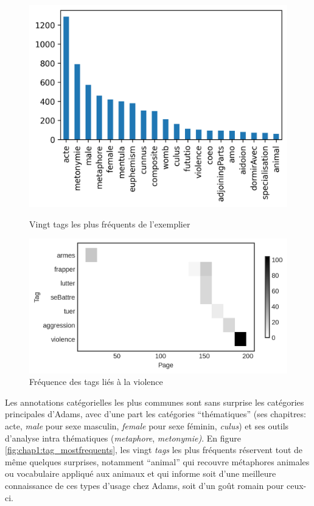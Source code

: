 \begin{figure}
    \centering
    \begin{minipage}[b]{.48\linewidth}%
        \includegraphics[width=\linewidth]{figures/chap1/part3/exemplier/tags.png}
        \caption{Vingt tags les plus fréquents de l'exemplier}
        \label{fig:chap1:tag_mostfrequents}
    \end{minipage}
    \hfill
    \begin{minipage}[b]{.48\linewidth}%
        \includegraphics[width=\linewidth]{figures/chap1/part3/exemplier/violence.png}
        \caption{Fréquence des tags liés à la violence}
        \label{fig:chap1:tags_violence}
    \end{minipage}
\end{figure}

Les annotations catégorielles les plus communes sont sans surprise les catégories principales d'Adams, avec d'une part les catégories \enquote{thématiques} (ses chapitres: acte, \textit{male} pour sexe masculin, \textit{female} pour sexe féminin, \textit{culus}) et ses outils d'analyse intra thématiques (\textit{metaphore}, \textit{metonymie)}. En figure \ref{fig:chap1:tag_mostfrequents}, les vingt \textit{tags} les plus fréquents réservent tout de même quelques surprises, notamment \enquote{animal} qui recouvre métaphores animales ou vocabulaire appliqué aux animaux et qui informe soit d'une meilleure connaissance de ces types d'usage chez Adams, soit d'un goût romain pour ceux-ci.

